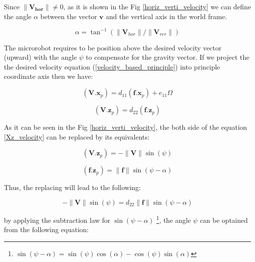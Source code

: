 \documentclass[12pt,a4paper,titlepage]{report}
\begin{document}
Since ${\| \bm{{V}_{hor}}\|} \neq 0$, as it is shown in the Fig \ref{horiz_verti_velocity} we can define 
the angle $\alpha$ between the vector $\bm{v}$ and the vertical axis in the world frame.



\begin{equation}
\alpha = {\tan}^{-1} ({\| \bm{V}_{hor} \|} / {\| \bm{V}_{ver} \|})
\label{alpha_velocity}  
\end{equation}

The microrobot requires to be position above the desired velocity vector (upward) with the angle $\psi$ 
 to compensate for the gravity vector. If we project the the desired velocity equation (\ref{velocity_based_principle})
into principle coordinate axis then we have:


\begin{equation}
(\bm{V} . \bm{x}_p) = d_{11} \left ({\bm{f} . {\bm{x}}_p   }  \right) + e_{11} \Omega 
\label{Xp_velocity}  
\end{equation}




\begin{equation}
(\bm{V} . \bm{z}_p) = d_{22} \left ({\bm{f} . {\bm{z}}_p   }  \right)
\label{Xz_velocity}  
\end{equation}

As it can be seen in the Fig \ref{horiz_verti_velocity}, the both side of the 
equation \ref{Xz_velocity} can be replaced by its equivalents:


\begin{equation}
(\bm{V} . \bm{z}_p) = - {\| \bm{V} \|} \sin(\psi)
\label{Xz_velocity_equival}  
\end{equation}


\begin{equation}
(\bm{f} . \bm{z}_p) = {\| \bm{f} \|} \sin(\psi - \alpha)
\label{Xz_velocity_equivali}  
\end{equation}



Thus, the replacing will lead to the following:


\begin{equation}
 - {\| \bm{V} \|} \sin(\psi) = d_{22} {\| \bm{f} \|} \sin(\psi - \alpha)
\label{finding_psi}  
\end{equation}

by applying the subtraction law for $ \sin(\psi - \alpha)$ \footnote{$\sin(\psi - \alpha) = 
\sin(\psi) \cos(\alpha) - \cos(\psi) \sin(\alpha)$},
 the angle $\psi$ can be optained from the following
equation:
\end{document}
